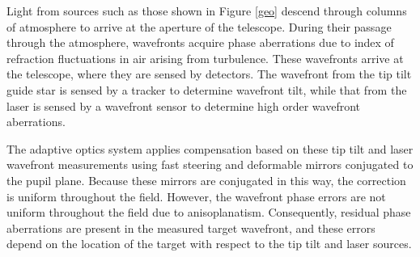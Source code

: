 
Light from sources such as those shown in Figure \ref{geo} descend
through columns of atmosphere to arrive at the aperture of the
telescope.  During their passage through the atmosphere, wavefronts
acquire phase aberrations due to index of refraction fluctuations in
air arising from turbulence.  These wavefronts arrive at the
telescope, where they are sensed by detectors.  The wavefront from the
tip tilt guide star is sensed by a tracker to determine wavefront
tilt, while that from the laser is sensed by a wavefront sensor to
determine high order wavefront aberrations.  

The adaptive optics system applies compensation based on these tip
tilt and laser wavefront measurements using fast steering and
deformable mirrors conjugated to the pupil plane.  Because these
mirrors are conjugated in this way, the correction is uniform
throughout the field.  However, the wavefront phase errors are not
uniform throughout the field due to anisoplanatism.  Consequently,
residual phase aberrations are present in the measured target
wavefront, and these errors depend on the location of the target with
respect to the tip tilt and laser sources.

